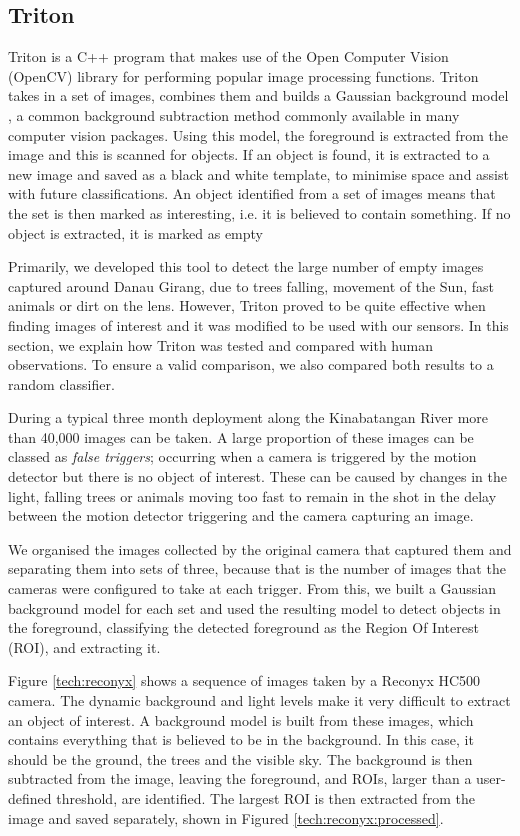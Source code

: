 	\subsection{Triton} \label{tech:sf:triton}
		Triton is a C++ program that makes use of the Open Computer Vision (OpenCV) library for performing popular image processing functions. Triton takes in a set of images, combines them and builds a Gaussian background model \cite{Zivkovic2004}, a common background subtraction method commonly available in many computer vision packages. Using this model, the foreground is extracted from the image and this is scanned for objects. If an object is found, it is extracted to a new image and saved as a black and white template, to minimise space and assist with future classifications. An object identified from a set of images means that the set is then marked as interesting, i.e. it is believed to contain something. If no object is extracted, it is marked as empty
		
		Primarily, we developed this tool to detect the large number of empty images captured around Danau Girang, due to trees falling, movement of the Sun, fast animals or dirt on the lens. However, Triton proved to be quite effective when finding images of interest and it was modified to be used with our sensors. In this section, we explain how Triton was tested and compared with human observations. To ensure a valid comparison, we also compared both results to a random classifier.
	
		During a typical three month deployment along the Kinabatangan River more than 40,000 images can be taken. A large proportion of these images can be classed as \textit{false triggers}; occurring when a camera is triggered by the motion detector but there is no object of interest. These can be caused by changes in the light, falling trees or animals moving too fast to remain in the shot in the delay between the motion detector triggering and the camera capturing an image.
		
		We organised the images collected by the original camera that captured them and separating them into sets of three, because that is the number of images that the cameras were configured to take at each trigger. From this, we built a Gaussian background model \cite{Zivkovic2004} for each set and used the resulting model to detect objects in the foreground, classifying the detected foreground as the Region Of Interest (ROI), and extracting it.
	
		Figure \ref{tech:reconyx} shows a sequence of images taken by a Reconyx HC500 camera. The dynamic background and light levels make it very difficult to extract an object of interest. A background model is built from these images, which contains everything that is believed to be in the background. In this case, it should be the ground, the trees and the visible sky. The background is then subtracted from the image, leaving the foreground, and ROIs, larger than a user-defined threshold, are identified. The largest ROI is then extracted from the image and saved separately, shown in Figured \ref{tech:reconyx:processed}.

